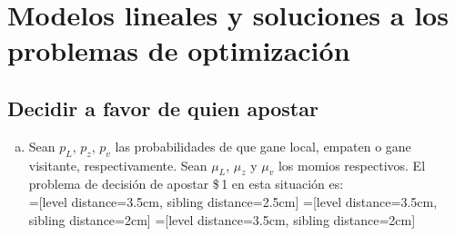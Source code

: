 \chapter{Modelos lineales y soluciones a los problemas de optimización}
\label{chap:ecuaciones}

 \section{Decidir a favor de quien apostar}
\label{apostar-a-quien}
 \begin{enumerate}[(a)]
  \item Sean $p_L$, $p_z$, $p_v$ las probabilidades de que gane local, empaten o gane visitante, respectivamente. Sean $\mu_L$, $\mu_z$ y $\mu_v$ los momios respectivos. El problema de decisión de apostar \$\,1 en esta situación es:\\
 
 =[level distance=3.5cm, sibling distance=2.5cm]
 =[level distance=3.5cm, sibling distance=2cm]
 =[level distance=3.5cm, sibling distance=2cm]



\end{enumerate}
